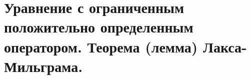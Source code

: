 \documentclass[__main__.tex]{subfiles}
\begin{document}
\section{Уравнение с ограниченным положительно определенным оператором. Теорема (лемма) Лакса-Мильграма.}
\end{document}
